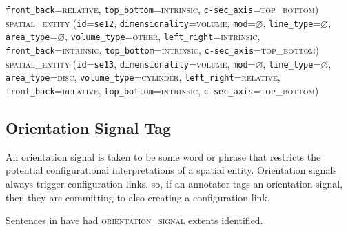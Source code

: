 \documentclass[11pt]{article}
\begin{document}
{            \texttt{front\_back}=\textsc{relative},
            \texttt{top\_bottom}=\textsc{intrinsic},
            \texttt{c-sec\_axis}=\textsc{top\_bottom})\vspace{0.5em}\\
        \textsc{spatial\_entity}
            (\texttt{id}=\texttt{se12},
            \texttt{dimensionality}=\textsc{volume},
            \texttt{mod}=$\varnothing$,
            \texttt{line\_type}=$\varnothing$,\\
            \texttt{area\_type}=$\varnothing$,
            \texttt{volume\_type}=\textsc{other},
            \texttt{left\_right}=\textsc{intrinsic},\\
            \texttt{front\_back}=\textsc{intrinsic},
            \texttt{top\_bottom}=\textsc{intrinsic},
            \texttt{c-sec\_axis}=\textsc{top\_bottom})\vspace{0.5em}\\
        \textsc{spatial\_entity}
            (\texttt{id}=\texttt{se13},
            \texttt{dimensionality}=\textsc{volume},
            \texttt{mod}=$\varnothing$,
            \texttt{line\_type}=$\varnothing$,\\
            \texttt{area\_type}=\textsc{disc},
            \texttt{volume\_type}=\textsc{cylinder},
            \texttt{left\_right}=\textsc{relative},\\
            \texttt{front\_back}=\textsc{relative},
            \texttt{top\_bottom}=\textsc{intrinsic},
            \texttt{c-sec\_axis}=\textsc{top\_bottom})\vspace{0.5em}\\
    \label{ex:table_flowers_etc}
}\label{ex:spatial_entity}



\subsection{Orientation Signal Tag} %
\label{sub:orientation_signal_tag}

An orientation signal is taken to be some word or phrase that restricts the potential configurational interpretations of a spatial entity. Orientation signals always trigger configuration links, so, if an annotator tags an orientation signal, then they are committing to also creating a configuration link.

Sentences in  have had \textsc{orientation\_signal} extents identified.
\end{document}
